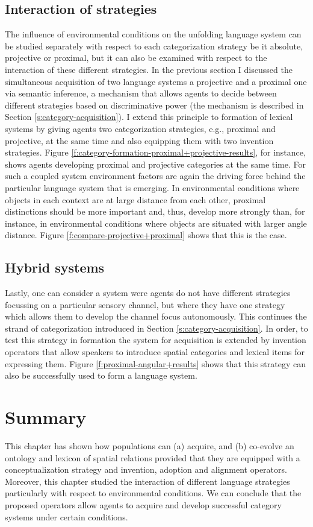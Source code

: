 \subsection{Interaction of strategies}
The influence of environmental conditions on the unfolding language system 
can be studied separately with respect to each categorization strategy be
it absolute, projective or proximal, but it can also be examined with respect
to the interaction of these different strategies. In the previous section 
I discussed the simultaneous acquisition of two language systems a projective and
a proximal one via {semantic inference}, a mechanism
that allows agents to decide between different strategies based on discriminative power
(the mechanism is described in Section \ref{s:category-acquisition}). 
I extend this principle to formation of lexical systems by giving agents 
two categorization strategies, e.g., proximal and projective, at the same time 
and also equipping them with two invention strategies. 
Figure \ref{f:category-formation-proximal+projective-results}, for instance, 
shows agents developing proximal and projective categories at the same time. 
For such a coupled system environment factors are again the driving force behind 
the particular language system that is emerging. In environmental conditions where
objects in each context are at large distance from each other, proximal distinctions
should be more important and, thus, develop more strongly than, for instance, 
in environmental conditions where objects are situated with larger angle distance. 
Figure \ref{f:compare-projective+proximal} shows that this is the case.

\subsection{Hybrid systems}
Lastly, one can consider a system were agents do not have different strategies 
focussing on a particular sensory channel, but where they have one strategy 
which allows them to develop the channel focus autonomously. 
This continues the strand of categorization introduced in
Section \ref{s:category-acquisition}. In order, to test this strategy in formation
the system for acquisition is extended by invention operators that allow
speakers to introduce spatial categories and lexical items for expressing them.
Figure \ref{f:proximal-angular+results} shows that this strategy can also be
successfully used to form a language system.

\section{Summary}
This chapter has shown how populations can (a)
acquire, and (b) co-evolve an ontology and lexicon of spatial relations 
provided that they are equipped with a conceptualization strategy 
and invention, adoption and alignment operators. 
Moreover, this chapter studied the interaction of different language strategies
particularly with respect to environmental conditions. We can conclude that
the proposed operators allow agents to acquire and develop successful category systems
under certain conditions. 


